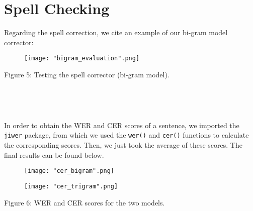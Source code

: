 \documentclass[11pt, a4paper]{article}
\begin{document}
	\section{Spell Checking}
	Regarding the spell correction, we cite an example of our bi-gram model corrector:

 \begin{figure}[H]
    \centering
    \texttt{[image: "bigram\_evaluation".png]}
    
    \label{fig:galaxy}
\end{figure}


\begin{centering}



\renewcommand{\caption}{Figure 5: }
\caption{Testing the spell corrector (bi-gram model).}

\end{centering} 

\ 

\

 
	In order to obtain the WER and CER scores of a sentence, we imported the \texttt{jiwer} package, from which we used the \texttt{wer()} and \texttt{cer()} functions to calculate the corresponding scores. Then, we just took the average of these scores. The final results can be found below.

 \begin{figure}[H]
    \centering
    \texttt{[image: "cer\_bigram".png]}
    
    \label{fig:galaxy}
\end{figure}


 \begin{figure}[H]
    \centering
    \texttt{[image: "cer\_trigram".png]}
    
    \label{fig:galaxy}
\end{figure}


\begin{centering}



\renewcommand{\caption}{Figure 6: }
\caption{WER and CER scores for the two models.}

\end{centering} 
	
	
\end{document}
